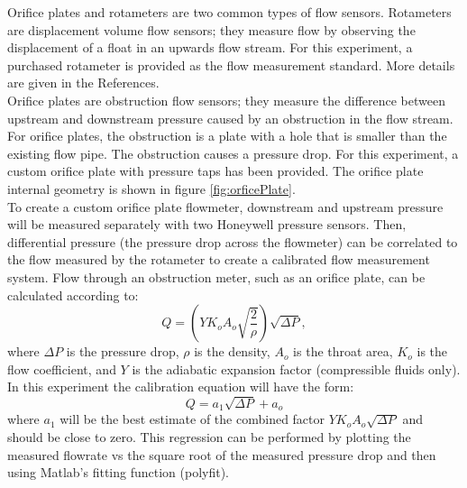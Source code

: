 \documentclass{article} %
\begin{document}
Orifice plates and rotameters are two common types of flow sensors. Rotameters are displacement volume flow sensors; they measure flow by observing the displacement of a float in an upwards flow stream. For this experiment, a purchased rotameter is provided as the flow measurement standard. More details are given in the References.\\
Orifice plates are obstruction flow sensors; they measure the difference between upstream and downstream pressure caused by an obstruction in the flow stream. For orifice plates, the obstruction is a plate with a hole that is smaller than the existing flow pipe. The obstruction causes a pressure drop. For this experiment, a custom orifice plate with pressure taps has been provided.  The orifice plate internal geometry is shown in figure \ref{fig:orficePlate}. \\
To create a custom orifice plate flowmeter, downstream and upstream pressure will be measured separately with two Honeywell pressure sensors. Then, differential pressure (the pressure drop across the flowmeter) can be correlated to the flow measured by the rotameter to create a calibrated flow measurement system.
Flow through an obstruction meter, such as an orifice plate, can be calculated according to:
\begin{equation}
Q= \left( Y K_{o}A_{o}\sqrt{\frac{2}{\rho}} \right) \sqrt{\Delta P},
\label{eq:calA}
\end{equation}
where $\Delta P$ is the pressure drop, $\rho$ is the density, $A_o$ is the throat area, $K_o$ is the flow coefficient, and $Y$ is the adiabatic expansion factor (compressible fluids only).  In this experiment the calibration equation will have the form:
\begin{equation}
Q = a_1 \sqrt{\Delta P} + a_o
\label{eq:calB}
\end{equation}
where $a_1$ will be the best estimate of the combined factor $Y K_{o}A_{o}\sqrt{\Delta P}$ and   should be close to zero.  This regression can be performed by plotting the measured flowrate vs the square root of the measured pressure drop and then using Matlab’s fitting function (polyfit).
\end{document}
